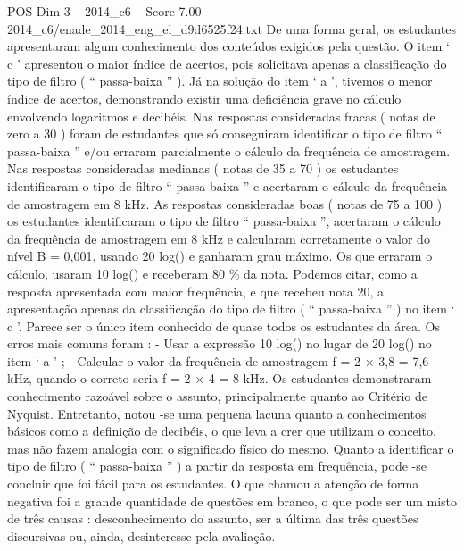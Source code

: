 \begin{textsample}{POS Dim 3 – 2014\_c6 – Score 7.00 – 2014\_c6/enade\_2014\_eng\_el\_d9d6525f24.txt}
De uma forma geral, os estudantes apresentaram algum conhecimento dos conteúdos exigidos pela questão.
O item ‘ c ’ apresentou o maior índice de acertos, pois solicitava apenas a classificação do tipo de filtro ( “ passa-baixa ” ).
Já na solução do item ‘ a ’, tivemos o menor índice de acertos, demonstrando existir uma deficiência grave no cálculo envolvendo logaritmos e decibéis.
Nas respostas consideradas fracas ( notas de zero a 30 ) foram de estudantes que só conseguiram identificar o tipo de filtro “ passa-baixa ” e/ou erraram parcialmente o cálculo da frequência de amostragem.
Nas respostas consideradas medianas ( notas de 35 a 70 ) os estudantes identificaram o tipo de filtro “ passa-baixa ” e acertaram o cálculo da frequência de amostragem em 8 kHz.
As respostas consideradas boas ( notas de 75 a 100 ) os estudantes identificaram o tipo de filtro “ passa-baixa ”, acertaram o cálculo da frequência de amostragem em 8 kHz e calcularam corretamente o valor do nível B = 0,001, usando 20 log() e ganharam grau máximo.
Os que erraram o cálculo, usaram 10 log() e receberam 80 \% da nota.
Podemos citar, como a resposta apresentada com maior frequência, e que recebeu nota 20, a apresentação apenas da classificação do tipo de filtro ( “ passa-baixa ” ) no item ‘ c ’.
Parece ser o único item conhecido de quase todos os estudantes da área.
Os erros mais comuns foram : - Usar a expressão 10 log() no lugar de 20 log() no item ‘ a ’ ; - Calcular o valor da frequência de amostragem f = 2 × 3,8 = 7,6 kHz, quando o correto seria f = 2 × 4 = 8 kHz.
Os estudantes demonstraram conhecimento razoável sobre o assunto, principalmente quanto ao Critério de Nyquist.
Entretanto, notou -se uma pequena lacuna quanto a conhecimentos básicos como a definição de decibéis, o que leva a crer que utilizam o conceito, mas não fazem analogia com o significado físico do mesmo.
Quanto a identificar o tipo de filtro ( “ passa-baixa ” ) a partir da resposta em frequência, pode -se concluir que foi fácil para os estudantes.
O que chamou a atenção de forma negativa foi a grande quantidade de questões em branco, o que pode ser um misto de três causas : desconhecimento do assunto, ser a última das três questões discursivas ou, ainda, desinteresse pela avaliação.

\end{textsample}
